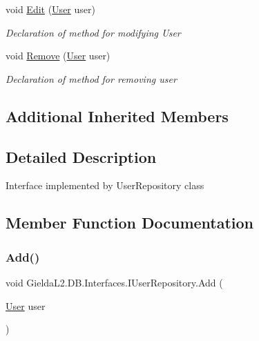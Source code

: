 \begin{DoxyCompactItemize}
void \mbox{\hyperlink{interface_gielda_l2_1_1_d_b_1_1_interfaces_1_1_i_user_repository_a65d2dc63fea742354209b2e13a15a452}{Edit}} (\mbox{\hyperlink{class_gielda_l2_1_1_d_b_1_1_entities_1_1_user}{User}} user)
\begin{DoxyCompactList}\small\item\em Declaration of method for modifying User \end{DoxyCompactList}\item 
void \mbox{\hyperlink{interface_gielda_l2_1_1_d_b_1_1_interfaces_1_1_i_user_repository_ad353a86a583d55065532459823c413f2}{Remove}} (\mbox{\hyperlink{class_gielda_l2_1_1_d_b_1_1_entities_1_1_user}{User}} user)
\begin{DoxyCompactList}\small\item\em Declaration of method for removing user \end{DoxyCompactList}\end{DoxyCompactItemize}
\subsection*{Additional Inherited Members}


\subsection{Detailed Description}
Interface implemented by User\+Repository class 



\subsection{Member Function Documentation}
\mbox{\label{interface_gielda_l2_1_1_d_b_1_1_interfaces_1_1_i_user_repository_afd1f24172cd7dd824feb7d1d67ff9475}} 
\subsubsection{\texorpdfstring{Add()}{Add()}}
{\footnotesize\ttfamily void Gielda\+L2.\+D\+B.\+Interfaces.\+I\+User\+Repository.\+Add (\begin{DoxyParamCaption}\item[{\mbox{\hyperlink{class_gielda_l2_1_1_d_b_1_1_entities_1_1_user}{User}}}]{user }\end{DoxyParamCaption})}



